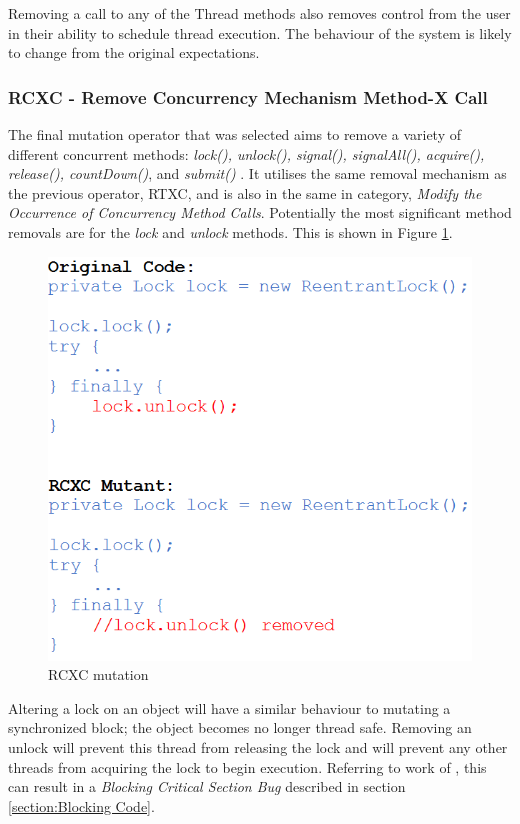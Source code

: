 \documentclass[a4paper,12pt]{article}
\begin{document}
Removing a call to any of the Thread methods also removes control from the user in their ability to schedule thread execution. The behaviour of the system is likely to change from the original expectations.

\subsubsection{RCXC - Remove Concurrency Mechanism Method-X Call}

The final mutation operator that was selected aims to remove a variety of different concurrent methods: \textit{lock(), unlock(), signal(), signalAll(), acquire(), release(), countDown()}, and \textit{submit()} \citep{bradbury06}. It utilises the same removal mechanism as the previous operator, RTXC, and is also in the same in category, \textit{Modify the Occurrence of Concurrency Method Calls}. Potentially the most significant method removals are for the \textit{lock} and \textit{unlock} methods. This is shown in Figure \ref{fig:RCXC}. 

\begin{figure}[h]
    \centering
    \includegraphics[scale = 0.6]{RCXC.png}
    \caption{RCXC mutation \citep{bradbury06}}
    \label{fig:RCXC}
\end{figure}	

Altering a lock on an object will have a similar behaviour to mutating a synchronized block; the object becomes no longer thread safe. Removing an unlock will prevent this thread from releasing the lock and will prevent any other threads from acquiring the lock to begin execution. Referring to work of \citet{farchi03}, this can result in a \textit{Blocking Critical Section Bug} described in section \ref{section:Blocking Code}.   
  	
\end{document}
